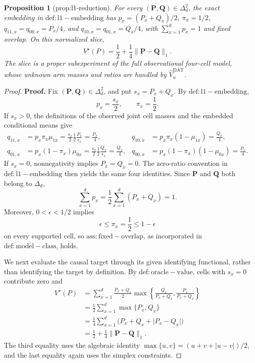 \documentclass{article}
\newtheorem{proposition}{Proposition}
\begin{document}
\begin{proposition}[prop:l1-reduction]\label{prop:l1-reduction}
For every \((\mathbf P,\mathbf Q)\in\Delta_d^2\), the exact embedding in \(\mathrm{def:l1-embedding}\) has \(p_x=(P_x+Q_x)/2\), \(\pi_x=1/2\), \(q_{11,x}=q_{00,x}=P_x/4\), and \(q_{10,x}=q_{01,x}=Q_x/4\), with \(\sum_{x=1}^dp_x=1\) and fixed overlap. On this normalized slice, \[V^\star(P)=\frac12+\frac14\lVert\mathbf P-\mathbf Q\rVert_1.\] The slice is a proper subexperiment of the full observational four-cell model, whose unknown arm masses and ratios are handled by \(\widehat V_n^{\mathrm{DAT}}\).
\end{proposition}
\begin{proof}
\textbf{Proof.}
Fix \((\mathbf P,\mathbf Q)\in\Delta_d^2\), and put \(s_x=P_x+Q_x\).  By \(\mathrm{def:l1-embedding}\),
\[
 p_x=\frac{s_x}{2},\qquad \pi_x=\frac12.
\]
If \(s_x>0\), the definitions of the observed joint cell masses and the embedded conditional means give
\[
\begin{aligned}
 q_{11,x}
 &=p_x\pi_x\mu_{1x}
 =\frac{s_x}{2}\frac12\frac{P_x}{s_x}
 =\frac{P_x}{4},
&
 q_{10,x}
 &=p_x\pi_x(1-\mu_{1x})
 =\frac{Q_x}{4},\\
 q_{01,x}
 &=p_x(1-\pi_x)\mu_{0x}
 =\frac{s_x}{2}\frac12\frac{Q_x}{s_x}
 =\frac{Q_x}{4},
&
 q_{00,x}
 &=p_x(1-\pi_x)(1-\mu_{0x})
 =\frac{P_x}{4}.
\end{aligned}
\]
If \(s_x=0\), nonnegativity implies \(P_x=Q_x=0\).  The zero-ratio convention in \(\mathrm{def:l1-embedding}\) then yields the same four identities.  Since \(\mathbf P\) and \(\mathbf Q\) both belong to \(\Delta_d\),
\[
 \sum_{x=1}^d p_x
 =\frac12\sum_{x=1}^d(P_x+Q_x)
 =1.
\]
Moreover, \(0<\epsilon<1/2\) implies
\[
 \epsilon\le \pi_x=\frac12\le 1-\epsilon
\]
on every supported cell, so \(\mathrm{ass:fixed-overlap}\), as incorporated in \(\mathrm{def:model-class}\), holds.

We next evaluate the causal target through its given identifying functional, rather than identifying the target by definition.  By \(\mathrm{def:oracle-value}\), cells with \(s_x=0\) contribute zero and
\[
\begin{aligned}
 V^\star(P)
 &=\sum_{x=1}^d \frac{P_x+Q_x}{2}
   \max\!\left\{\frac{Q_x}{P_x+Q_x},
                    \frac{P_x}{P_x+Q_x}\right\}\\
 &=\frac12\sum_{x=1}^d\max\{P_x,Q_x\}\\
 &=\frac14\sum_{x=1}^d
   \bigl(P_x+Q_x+\lvert P_x-Q_x\rvert\bigr)\\
 &=\frac12+\frac14\lVert\mathbf P-\mathbf Q\rVert_1.
\end{aligned}
\]
The third equality uses the algebraic identity \(\max\{u,v\}=(u+v+\lvert u-v\rvert)/2\), and the last equality again uses the simplex constraints.


\end{proof}
\end{document}
